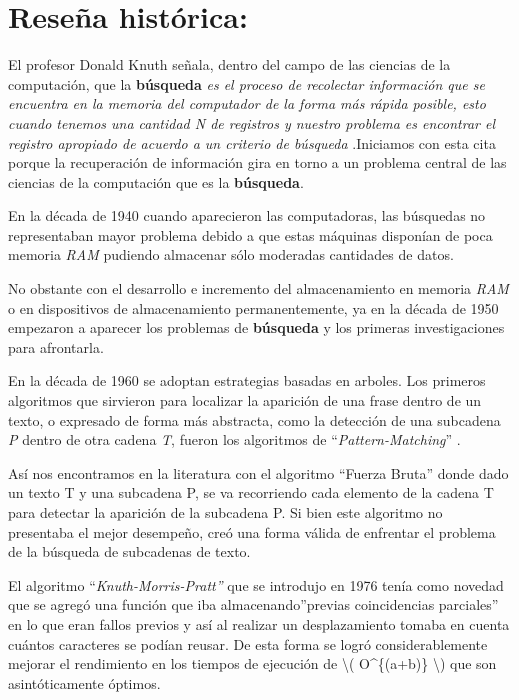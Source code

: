 \documentclass[
  10,
  openany]{book}
\begin{document}
\hypertarget{alghist}{%
\section{Reseña histórica:}\label{alghist}}

El profesor Donald Knuth señala, dentro del campo de las ciencias de la computación, que la \textbf{búsqueda} \emph{es el proceso de recolectar información que se encuentra en la memoria del computador de la forma más rápida posible, esto cuando tenemos una cantidad N de registros y nuestro problema es encontrar el registro apropiado de acuerdo a un criterio de búsqueda} \citep[p.392]{knuth1997} .Iniciamos con esta cita porque la recuperación de información gira en torno a un problema central de las ciencias de la computación que es la \textbf{búsqueda}.

En la década de 1940 cuando aparecieron las computadoras, las búsquedas no representaban mayor problema debido a que estas máquinas disponían de poca memoria \emph{RAM} pudiendo almacenar sólo moderadas cantidades de datos.

No obstante con el desarrollo e incremento del almacenamiento en memoria \emph{RAM} o en dispositivos de almacenamiento permanentemente, ya en la década de 1950 empezaron a aparecer los problemas de \textbf{búsqueda} y los primeras investigaciones para afrontarla.

En la década de 1960 se adoptan estrategias basadas en arboles. Los primeros algoritmos que sirvieron para localizar la aparición de una frase dentro de un texto, o expresado de forma más abstracta, como la detección de una subcadena \emph{P} dentro de otra cadena \emph{T}, fueron los algoritmos de ``\emph{Pattern-Matching}'' \citep{goodrich2013}.

Así nos encontramos en la literatura con el algoritmo ``Fuerza Bruta'' donde dado un texto T y una subcadena P, se va recorriendo cada elemento de la cadena T para detectar la aparición de la subcadena P. Si bien este algoritmo no presentaba el mejor desempeño, creó una forma válida de enfrentar el problema de la búsqueda de subcadenas de texto.

El algoritmo ``\emph{Knuth-Morris-Pratt''} que se introdujo en 1976 tenía como novedad que se agregó una función que iba almacenando''previas coincidencias parciales'' en lo que eran fallos previos y así al realizar un desplazamiento tomaba en cuenta cuántos caracteres se podían reusar. De esta forma se logró considerablemente mejorar el rendimiento en los tiempos de ejecución de \textbackslash( O\^{}\{(a+b)\} \textbackslash) que son asintóticamente óptimos.
\end{document}
